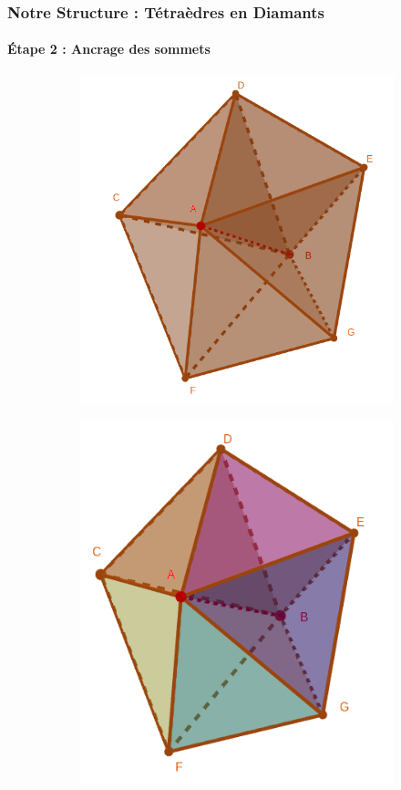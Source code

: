\documentclass[9pt]{beamer}
\begin{document}
\begin{frame}
\small
\frametitle{Notre Structure : Tétraèdres en Diamants}
\framesubtitle{\'{E}tape 2 : Ancrage des sommets}
\begin{figure}[H]
\centering
\begin{subfigure}{.32\textwidth}
  \centering
  \includegraphics[scale=0.12]{../Images/central_edge_AB}
  \caption{}
  \label{fig:central_edge_AB}
\end{subfigure}%
\begin{subfigure}{.32\textwidth}
  \centering
  \includegraphics[scale=0.16]{../Images/explosion_diamond}

\end{subfigure}
\end{figure}
\end{frame}
\end{document}
